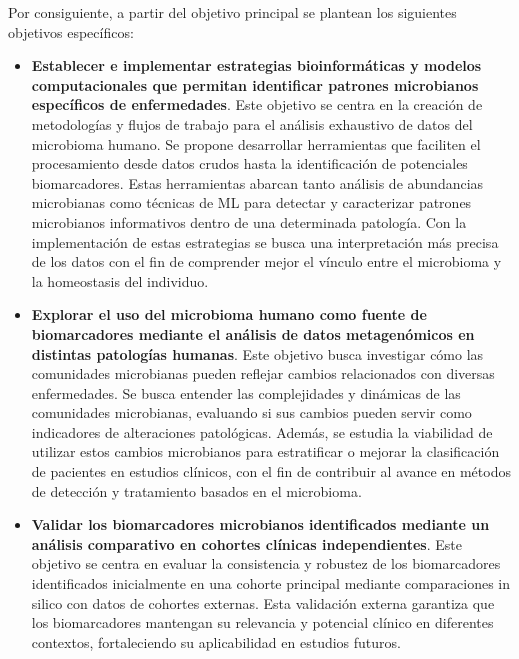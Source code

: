Por consiguiente, a partir del objetivo principal se plantean los siguientes objetivos específicos:
\begin{itemize}
    \item \textbf{Establecer e implementar estrategias bioinformáticas y modelos computacionales que permitan identificar patrones microbianos específicos de enfermedades}. Este objetivo se centra en la creación de metodologías y flujos de trabajo para el análisis exhaustivo de datos del microbioma humano. Se propone desarrollar herramientas que faciliten el procesamiento desde datos crudos hasta la identificación de potenciales biomarcadores. Estas herramientas abarcan tanto análisis de abundancias microbianas como técnicas de ML para detectar y caracterizar patrones microbianos informativos dentro de una determinada patología. Con la implementación de estas estrategias se busca una interpretación más precisa de los datos con el fin de comprender mejor el vínculo entre el microbioma y la homeostasis del individuo.
    
    \item \textbf{Explorar el uso del microbioma humano como fuente de biomarcadores mediante el análisis de datos metagenómicos en distintas patologías humanas}. Este objetivo busca investigar cómo las comunidades microbianas pueden reflejar cambios relacionados con diversas enfermedades. Se busca entender las complejidades y dinámicas de las comunidades microbianas, evaluando si sus cambios pueden servir como indicadores de alteraciones patológicas. Además, se estudia la viabilidad de utilizar estos cambios microbianos para estratificar o mejorar la clasificación de pacientes en estudios clínicos, con el fin de contribuir al avance en métodos de detección y tratamiento basados en el microbioma.

    \item \textbf{Validar los biomarcadores microbianos identificados mediante un análisis comparativo en cohortes clínicas independientes}. Este objetivo se centra en evaluar la consistencia y robustez de los biomarcadores identificados inicialmente en una cohorte principal mediante comparaciones in silico con datos de cohortes externas. Esta validación externa garantiza que los biomarcadores mantengan su relevancia y potencial clínico en diferentes contextos, fortaleciendo su aplicabilidad en estudios futuros.
    
\end{itemize}



